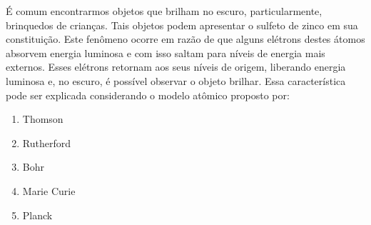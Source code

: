 É comum encontrarmos objetos que brilham no escuro, particularmente, brinquedos de crianças.
Tais objetos podem apresentar o sulfeto de zinco em sua constituição.
Este fenômeno ocorre em razão de que alguns elétrons destes átomos absorvem energia luminosa e com isso saltam para níveis de energia mais externos.
Esses elétrons retornam aos seus níveis de origem, liberando energia luminosa e, no escuro, é possível observar o objeto brilhar.
Essa característica pode ser explicada considerando o modelo atômico proposto por:

\begin{enumerate}[label = (\alph*)]
	\item Thomson				
	\item Rutherford
	\item Bohr					
	\item Marie Curie
	\item Planck
\end{enumerate}
